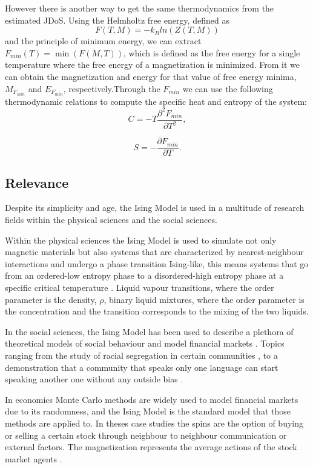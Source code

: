\pagebreak

However there is another way to get the same thermodynamics from the estimated JDoS.  Using the Helmholtz free energy, defined as 
\begin{equation}
	F(T, M) = - k_B ln(Z(T, M))
\end{equation}
and the principle of minimum energy, we can extract $F_{min} (T) = \min(F(M, T))$, which is defined as the free energy for a single temperature where the free energy of a magnetization is minimized.
From it we can obtain the magnetization and energy for that value of free energy minima, $M_{F_{min}}$ and $E_{F_{min}}$, respectively.Through the $F_{min}$ we can use the following thermodynamic relations to compute the specific heat and entropy of the system:
\begin{equation}
	C = - T \frac{\partial^2 F_{min}}{\partial T^2},
\end{equation}

\begin{equation}
	S = - \frac{\partial F_{min}}{\partial T}.
\end{equation}

\subsection{Relevance}

Despite its simplicity and age, the Ising Model is used in a multitude of research fields within the physical sciences and the social sciences. 

Within the physical sciences the Ising Model is used to simulate not only magnetic materials but also systems that are characterized by nearest-neighbour interactions and undergo a phase transition Ising-like, this means systems that go from an ordered-low entropy phase to a disordered-high entropy phase at a specific critical temperature \cite{Pelissetto2002}. 
Liquid vapour transitions, where the order parameter is the density, $\rho$, binary liquid mixtures, where the order parameter is the concentration and the transition corresponds to the mixing of the two liquids.

In the social sciences, the Ising Model has been used to describe a plethora of theoretical models of social behaviour and model financial markets \cite{review_social_ising}. 
Topics ranging from the study of racial segregation in certain communities \cite{segregation}, to a demonstration that a community that speaks only one language can start speaking another one without any outside bias \cite{language_ising}.

In economics Monte Carlo methods are widely used to model financial markets due to its randomness, and the Ising Model is the standard model that those methods are applied to. In theses case studies the spins are the option of buying or selling a certain stock through neighbour to neighbour communication or external factors. The magnetization represents the average actions of the stock market agents \cite{stock_ising, eco_thesis}.












